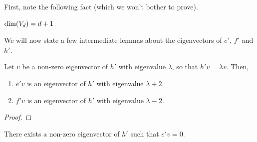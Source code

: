 First, note the following fact (which we won't bother to prove).

\begin{lemma}
    $\dim\!\left( V_d \right) = d + 1$.
\end{lemma}

We will now state a few intermediate lemmas about the eigenvectors of $e'$, $f'$ and $h'$.

\begin{lemma}
    Let $v$ be a non-zero eigenvector of $h'$ with eigenvalue $\lambda$, so that $h'v = \lambda v$. Then,
    \begin{enumerate}[label = \normalfont \arabic*., noitemsep]
        \item $e'v$ is an eigenvector of $h'$ with eigenvalue $\lambda + 2$.
        \item $f'v$ is an eigenvector of $h'$ with eigenvalue $\lambda - 2$.
    \end{enumerate}
\end{lemma}
\begin{proof}
    \sorry %
\end{proof}
\begin{lemma}
    There exists a non-zero eigenvector of $h'$ such that $e' v = 0$.
\end{lemma}
